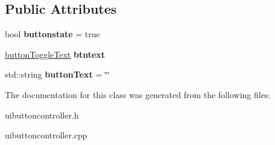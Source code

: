 \subsection*{Public Attributes}
\begin{DoxyCompactItemize}
\item 
\mbox{\label{classuibutton_controller_a48b805f32edc5a19b33e9337f2e2e81b}} 
bool {\bfseries buttonstate} = true
\item 
\mbox{\label{classuibutton_controller_a4806f09c7b0dc723c73b8a2e3a5164c8}} 
\mbox{\hyperlink{structbutton_toggle_text}{button\+Toggle\+Text}} {\bfseries btntext}
\item 
\mbox{\label{classuibutton_controller_a439a026d80344f862714c2b37ce4fe9d}} 
std\+::string {\bfseries button\+Text} = \char`\"{}\char`\"{}
\end{DoxyCompactItemize}


The documentation for this class was generated from the following files\+:\begin{DoxyCompactItemize}
\item 
uibuttoncontroller.\+h\item 
uibuttoncontroller.\+cpp\end{DoxyCompactItemize}
